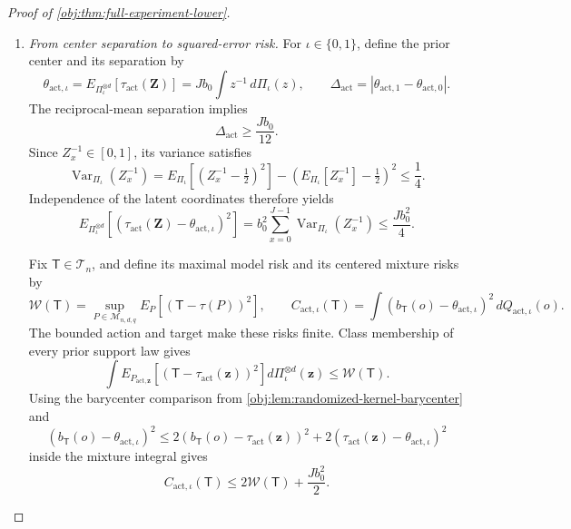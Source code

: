 \documentclass[11pt]{article}
\begin{document}
\begin{proof}[Proof of \cref{obj:thm:full-experiment-lower}]
\begin{enumerate}
Equality of the atoms on \(\mathcal G\) implies equality of the probabilities
of \(\mathcal G\), and hence of its complement. For every augmented-sample
event \(\mathcal B\),
\[
\begin{aligned}
&\left|
\widetilde Q_{\mathrm{act},0}(\mathcal B)
-\widetilde Q_{\mathrm{act},1}(\mathcal B)
\right|\\
&\quad=
\left|
\widetilde Q_{\mathrm{act},0}(\mathcal B\cap\mathcal G^c)
-\widetilde Q_{\mathrm{act},1}(\mathcal B\cap\mathcal G^c)
\right|
\le\widetilde Q_{\mathrm{act},0}(\mathcal G^c).
\end{aligned}
\]
Applying this inequality to preimages under the forgetting map gives
\[
\operatorname{TV}(Q_{\mathrm{act},0},Q_{\mathrm{act},1})
\le
\operatorname{TV}(\widetilde Q_{\mathrm{act},0},
\widetilde Q_{\mathrm{act},1})
\le\frac18.
\]

\item \emph{From center separation to squared-error risk.}
For \(\iota\in\{0,1\}\), define the prior center and its separation by
\[
\theta_{\mathrm{act},\iota}
=E_{\Pi_\iota^{\otimes d}}[\tau_{\mathrm{act}}(\mathbf Z)]
=Jb_0\int z^{-1}\,d\Pi_\iota(z),
\qquad
\Delta_{\mathrm{act}}
=|\theta_{\mathrm{act},1}-\theta_{\mathrm{act},0}|.
\]
The reciprocal-mean separation implies
\[
\Delta_{\mathrm{act}}\ge\frac{Jb_0}{12}.
\]
Since \(Z_x^{-1}\in[0,1]\), its variance satisfies
\[
\operatorname{Var}_{\Pi_\iota}(Z_x^{-1})
=
E_{\Pi_\iota}\!\left[(Z_x^{-1}-\tfrac12)^2\right]
-\left(E_{\Pi_\iota}[Z_x^{-1}]-\tfrac12\right)^2
\le\frac14.
\]
Independence of the latent coordinates therefore yields
\[
E_{\Pi_\iota^{\otimes d}}\!\left[
(\tau_{\mathrm{act}}(\mathbf Z)-\theta_{\mathrm{act},\iota})^2
\right]
=
b_0^2\sum_{x=0}^{J-1}
\operatorname{Var}_{\Pi_\iota}(Z_x^{-1})
\le\frac{Jb_0^2}{4}.
\]

Fix \(\mathsf T\in\mathcal T_n\), and define its maximal model risk and its
centered mixture risks by
\[
\mathcal W(\mathsf T)
=
\sup_{P\in\mathcal M_{n,d,q}}
E_P[(\mathsf T-\tau(P))^2],
\qquad
C_{\mathrm{act},\iota}(\mathsf T)
=
\int
(b_{\mathsf T}(o)-\theta_{\mathrm{act},\iota})^2\,
dQ_{\mathrm{act},\iota}(o).
\]
The bounded action and target make these risks finite. Class membership of
every prior support law gives
\[
\int
E_{P_{\mathrm{act},\mathbf z}}\!\left[
(\mathsf T-\tau_{\mathrm{act}}(\mathbf z))^2
\right]
d\Pi_\iota^{\otimes d}(\mathbf z)
\le\mathcal W(\mathsf T).
\]
Using the barycenter comparison from
\cref{obj:lem:randomized-kernel-barycenter} and
\[
(b_{\mathsf T}(o)-\theta_{\mathrm{act},\iota})^2
\le
2(b_{\mathsf T}(o)-\tau_{\mathrm{act}}(\mathbf z))^2
+
2(\tau_{\mathrm{act}}(\mathbf z)-\theta_{\mathrm{act},\iota})^2
\]
inside the mixture integral gives
\[
C_{\mathrm{act},\iota}(\mathsf T)
\le2\mathcal W(\mathsf T)+\frac{Jb_0^2}{2}.
\]


\end{enumerate}
\end{proof}
\end{document}
